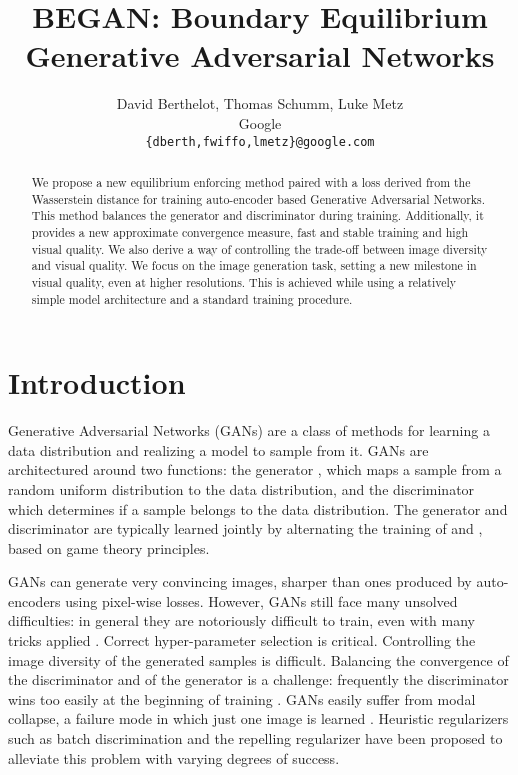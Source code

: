 \documentclass[english]{article}
\newenvironment{lyxcode}
{\par\begin{list}{}{
\setlength{\rightmargin}{\leftmargin}
\setlength{\listparindent}{0pt}\raggedright
\setlength{\itemsep}{0pt}
\setlength{\parsep}{0pt}
\normalfont\ttfamily}\item[]}
{\end{list}}
\begin{document}
\begin{lyxcode}

\end{lyxcode}

\title{BEGAN: Boundary Equilibrium Generative Adversarial Networks}


\author{David Berthelot, Thomas Schumm, Luke Metz\\ 
Google\\
\texttt{\{dberth,fwiffo,lmetz\}@google.com}}
\maketitle
\begin{abstract}
We propose a new equilibrium enforcing method paired with a loss derived
from the Wasserstein distance for training auto-encoder based Generative
Adversarial Networks. This method balances the generator and discriminator
during training. Additionally, it provides a new approximate convergence
measure, fast and stable training and high visual quality. We also
derive a way of controlling the trade-off between image diversity
and visual quality. We focus on the image generation task, setting
a new milestone in visual quality, even at higher resolutions. This
is achieved while using a relatively simple model architecture and
a standard training procedure. 
\end{abstract}

\section{Introduction}

Generative Adversarial Networks \cite{goodfellow2014generative_gan}(GANs)
are a class of methods for learning a data distribution 
and realizing a model to sample from it. GANs are architectured around
two functions: the generator , which maps a sample  from
a random uniform distribution to the data distribution, and the discriminator
 which determines if a sample  belongs to the data distribution.
The generator and discriminator are typically learned jointly by alternating
the training of  and , based on game theory principles. 

GANs can generate very convincing images, sharper than ones produced
by auto-encoders using pixel-wise losses. However, GANs still face
many unsolved difficulties: in general they are notoriously difficult
to train, even with many tricks applied \cite{radford2015unsupervised_dcgan,salimans2016improved}.
Correct hyper-parameter selection is critical. Controlling the image
diversity of the generated samples is difficult. Balancing the convergence
of the discriminator and of the generator is a challenge: frequently
the discriminator wins too easily at the beginning of training \cite{goodfellow2016nips_gantut}.
GANs easily suffer from modal collapse, a failure mode in which just
one image is learned \cite{dumoulin2016adversarially}. Heuristic
regularizers such as batch discrimination \cite{salimans2016improved}
and the repelling regularizer \cite{zhao2016energy_ebgan} have been
proposed to alleviate this problem with varying degrees of success. 
\end{document}
